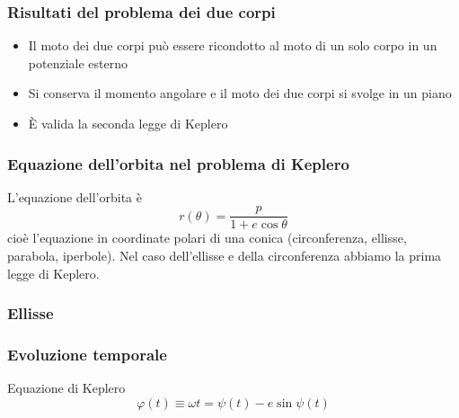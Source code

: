 \documentclass[10pt]{beamer}
\renewcommand{\phi}{\varphi}
\begin{document}
\begin{frame}
  \frametitle{Risultati del problema dei due corpi}
  \begin{itemize}[<+->]
  \item Il moto dei due corpi può essere ricondotto al
    \alert{moto di un solo corpo} in un potenziale esterno
  \item Si \alert{conserva il momento angolare} e il moto dei due corpi si
    svolge in un \alert{piano} \\
    \centering
    \begin{tikzpicture}[tdplot_main_coords,scale=2.5,font=\scriptsize]
      
    \end{tikzpicture}
  \item È valida la \alert{seconda legge di Keplero}
  \end{itemize}
\end{frame}

\begin{frame}
  \frametitle{Equazione dell'orbita nel problema di Keplero}
  L'equazione dell'orbita è
  \begin{equation*}
    r(\theta) = \frac{p}{1 + e \cos\theta}
  \end{equation*}
cioè l'equazione in coordinate polari di una conica (circonferenza, ellisse,
parabola, iperbole). Nel caso dell'ellisse e della circonferenza abbiamo la
\alert{prima legge di Keplero}.
\end{frame}

\begin{frame}
  \frametitle{Ellisse}
  \begin{tikzpicture}[scale=4.5,font=\tiny]
    
  \end{tikzpicture}
\end{frame}

%       

\begin{frame}
  \frametitle{Evoluzione temporale}
  \begin{block}{Equazione di Keplero}
    \begin{equation*}
    \phi(t) \equiv \omega t = \psi(t) - e\sin\psi(t)
  \end{equation*}
  \end{block}
  \begin{center}
    \begin{tikzpicture}[font=\tiny,scale=1.9]
      
    \end{tikzpicture}
  \end{center}
\end{frame}
\end{document}
